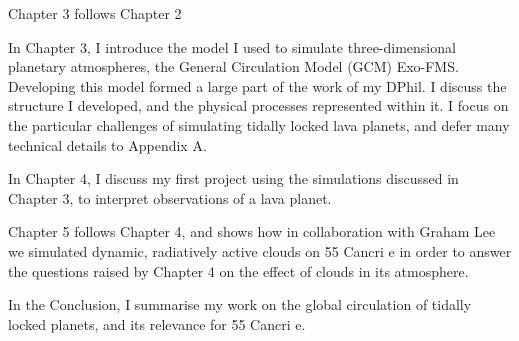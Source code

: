 Chapter 3 follows Chapter 2

In Chapter 3, I introduce the model I used to simulate three-dimensional planetary atmospheres, the General Circulation Model (GCM) Exo-FMS. Developing this model formed a large part of the work of my DPhil. I discuss the structure I developed, and the physical processes represented within it. I focus on the particular challenges of simulating tidally locked lava planets, and defer many technical details to Appendix A.

In Chapter 4, I discuss my first project using the simulations discussed in Chapter 3, to interpret observations of a lava planet.

Chapter 5 follows Chapter 4, and shows how in collaboration with Graham Lee we simulated dynamic, radiatively active clouds on 55 Cancri e in order to answer the questions raised by Chapter 4 on the effect of clouds in its atmosphere.

In the Conclusion, I summarise my work on the global circulation of tidally locked planets, and its relevance for 55 Cancri e.



% 
% 
